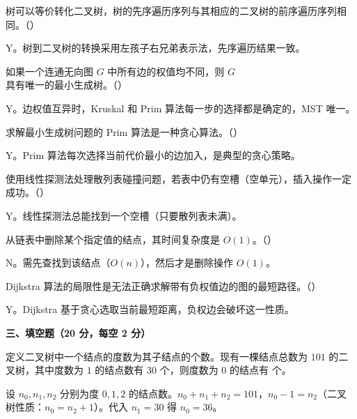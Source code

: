 \begin{question}
树可以等价转化二叉树，树的先序遍历序列与其相应的二叉树的前序遍历序列相同。（\quad）
\begin{solution}
Y。树到二叉树的转换采用左孩子右兄弟表示法，先序遍历结果一致。
\end{solution}
\end{question}

\begin{question}
如果一个连通无向图 $G$ 中所有边的权值均不同，则 $G$ 具有唯一的最小生成树。（\quad）
\begin{solution}
Y。边权值互异时，Kruskal 和 Prim 算法每一步的选择都是确定的，MST 唯一。
\end{solution}
\end{question}

\begin{question}
求解最小生成树问题的 Prim 算法是一种贪心算法。（\quad）
\begin{solution}
Y。Prim 算法每次选择当前代价最小的边加入，是典型的贪心策略。
\end{solution}
\end{question}

\begin{question}
使用线性探测法处理散列表碰撞问题，若表中仍有空槽（空单元），插入操作一定成功。（\quad）
\begin{solution}
Y。线性探测法总能找到一个空槽（只要散列表未满）。
\end{solution}
\end{question}

\begin{question}
从链表中删除某个指定值的结点，其时间复杂度是 $O(1)$。（\quad）
\begin{solution}
N。需先查找到该结点（$O(n)$），然后才是删除操作 $O(1)$。
\end{solution}
\end{question}

\begin{question}
Dijkstra 算法的局限性是无法正确求解带有负权值边的图的最短路径。（\quad）
\begin{solution}
Y。Dijkstra 基于贪心选取当前最短距离，负权边会破坏这一性质。
\end{solution}
\end{question}

\clearpage

\textbf{三、填空题（20 分，每空 2 分）}

\begin{question}
定义二叉树中一个结点的度数为其子结点的个数。现有一棵结点总数为 $101$ 的二叉树，其中度数为 $1$ 的结点数有 $30$ 个，则度数为 $0$ 的结点有 \underline{\hspace{4em}} 个。
\begin{solution}
设 $n_0,n_1,n_2$ 分别为度 $0,1,2$ 的结点数。$n_0+n_1+n_2=101$，$n_0-1=n_2$（二叉树性质：$n_0=n_2+1$）。代入 $n_1=30$ 得 $n_0=36$。
\end{solution}
\end{question}

